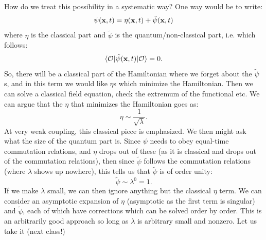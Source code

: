 How do we treat this possibility in a systematic way? One way would be to write:
\begin{equation}
    \psi(\mathbf{x}, t) = \eta(\mathbf{x}, t) + \tilde{\psi}(\mathbf{x}, t)
\end{equation}
where $\eta$ is the classical part and $\tilde{\psi}$ is the quantum/non-classical part, i.e. which follows:
\begin{equation}
    \langle \mathcal{O} \rvert\tilde{\psi}(\mathbf{x}, t)\lvert \mathcal{O} \rangle = 0.
\end{equation}
So, there will be a classical part of the Hamiltonian where we forget about the $\tilde{\psi}$s, and in this term we would like $\eta$s which minimize the Hamiltonian. Then we can solve a classical field equation, check the extremum of the functional etc. We can argue that the $\eta$ that minimizes the Hamiltonian goes as:
\begin{equation}
    \eta \sim \frac{1}{\sqrt{\lambda}}.
\end{equation}
At very weak coupling, this classical piece is emphasized. We then might ask what the size of the quantum part is. Since $\psi$ needs to obey equal-time commutation relations, and $\eta$ drops out of these (as it is classical and drops out of the commutation relations), then since $\tilde{\psi}$ follows the commutation relations (where $\lambda$ shows up nowhere), this tells us that $\tilde{\psi}$ is of order unity:
\begin{equation}
    \tilde{\psi} \sim \lambda^0 = 1.
\end{equation}
If we make $\lambda$ small, we can then ignore anything but the classical $\eta$ term. We can consider an asymptotic expansion of $\eta$ (asymptotic as the first term is singular) and $\tilde{\psi}$, each of which have corrections which can be solved order by order. This is an arbitrarily good approach so long as $\lambda$ is arbitrary small and nonzero. Let us take it (next class!)

